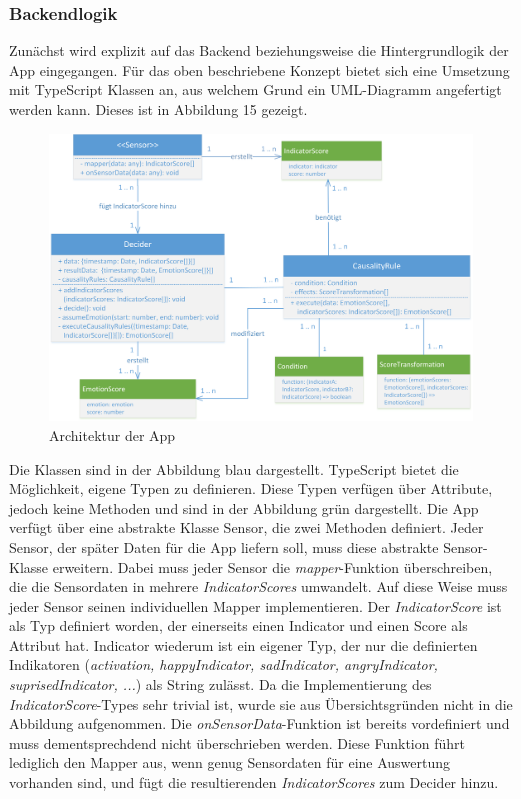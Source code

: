 \subsubsection{Backendlogik}
Zunächst wird explizit auf das Backend beziehungsweise die Hintergrundlogik der App eingegangen. Für das oben beschriebene Konzept bietet sich eine Umsetzung mit TypeScript Klassen an, aus welchem Grund ein UML-Diagramm angefertigt werden kann. Dieses ist in Abbildung 15 gezeigt. \newline
\begin{figure}[h]
	\centering
	\includegraphics[width=16cm]{Bilder/architecture.png}
	\caption[Architektur der App]{Architektur der App}
\end{figure}%
\newline \newline
Die Klassen sind in der Abbildung blau dargestellt. TypeScript bietet die Möglichkeit, eigene Typen zu definieren. Diese Typen verfügen über Attribute, jedoch keine Methoden und sind in der Abbildung grün dargestellt. \newline
Die App verfügt über eine abstrakte Klasse Sensor, die zwei Methoden definiert. Jeder Sensor, der später Daten für die App liefern soll, muss diese abstrakte Sensor-Klasse erweitern. Dabei muss jeder Sensor die \textit{mapper}-Funktion überschreiben, die die Sensordaten in mehrere \textit{IndicatorScores} umwandelt. Auf diese Weise muss jeder Sensor seinen individuellen Mapper implementieren. Der \textit{IndicatorScore} ist als Typ definiert worden, der einerseits einen Indicator und einen Score als Attribut hat. Indicator wiederum ist ein eigener Typ, der nur die definierten Indikatoren (\textit{activation, happyIndicator, sadIndicator, angryIndicator, suprisedIndicator, ...}) als String zulässt. Da die Implementierung des \textit{IndicatorScore}-Types sehr trivial ist, wurde sie aus Übersichtsgründen nicht in die Abbildung aufgenommen. Die \textit{onSensorData}-Funktion ist bereits vordefiniert und muss dementsprechdend nicht überschrieben werden. Diese Funktion führt lediglich den Mapper aus, wenn genug Sensordaten für eine Auswertung vorhanden sind, und fügt die resultierenden \textit{IndicatorScores} zum Decider hinzu. \newline \newline
